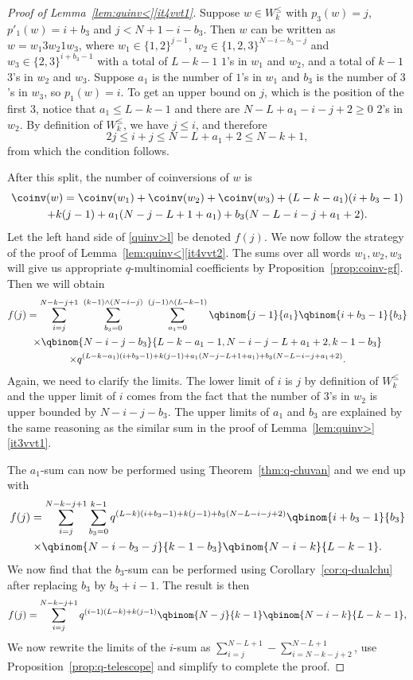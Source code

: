 \begin{proof}[Proof of Lemma~\ref{lem:quinv<}\ref{it4vvt1}]
Suppose $w \in  W_k^\leq$ with $p_3(w) = j$, $p'_1(w) = i+b_3$ and $j < N+1 - i-b_3$. Then
$w$ can be written as $w = w_1 3 w_2 1 w_3$, where $w_1 \in \{1,2\}^{j-1}$, $w_2 \in \{1,2,3\}^{N-i-b_3-j}$ 
and $w_3 \in \{2,3\}^{i+b_3-1}$ with a total of $L-k-1$ $1$'s in $w_1$ and $w_2$, and a total of
$k-1$ $3$'s in $w_2$ and $w_3$. 
Suppose $a_1$ is the number of $1$'s in $w_1$ and $b_3$ is the number of $3$'s in $w_3$, so $p_1(w) = i$. To get an upper bound on $j$, which is the position of the first $3$, notice that $a_1 \leq L-k-1$ and
there are $N-L+a_1-i-j+2\geq 0$ $2$'s in $w_2$. By definition of $W_k^{\leq}$, we have $j \leq i$, and therefore
\[
2j \leq i+j \leq N - L + a_1 + 2 \leq N - k+1,
\]
from which the condition follows.

After this split, the number of coinversions of $w$ is
\begin{multline*}
\coinv(w) = \coinv(w_1) + \coinv(w_2) +\coinv(w_3) + (L-k-a_1)(i+b_3-1)  \\
+ k(j-1) + a_1(N-j-L+1+a_1) + b_3(N-L-i-j+a_1+2).
\end{multline*}
Let the left hand side of \eqref{quinv>l} be denoted $f(j)$.
We now follow the strategy of the proof of Lemma~\ref{lem:quinv<}\ref{it4vvt2}. 
The sums over all
words $w_1, w_2, w_3$ will give us appropriate $q$-multinomial coefficients by 
Proposition~\ref{prop:coinv-gf}. Then we will obtain
\begin{multline*}
f(j) = \sum_{i = j}^{N-k-j+1}\  \sum_{b_3 = 0}^{(k-1) \wedge (N-i-j)}\ \sum_{a_1 = 0}^{(j-1) \wedge (L-k-1)} 
\qbinom {j-1}{a_1} \qbinom{i+b_3-1}{b_3} \\
\times\qbinom {N-i-j-b_3}{L-k-a_1-1, N-i-j-L+a_1+2,k-1-b_3} \\
\times q^{(L-k-a_1)(i+b_3-1) + k(j-1) + a_1(N-j-L+1+a_1) + b_3(N-L-i-j+a_1+2)}.
\end{multline*}
Again, we need to clarify the limits. The lower limit of $i$ is $j$ by definition of $W_k^\leq$
and the upper limit of $i$ comes from the fact that the number of $3$'s in $w_2$ is upper bounded
by $N-i-j-b_3$. The upper limits of $a_1$ and $b_3$ are explained by the same reasoning
as the similar sum in the proof of Lemma~\ref{lem:quinv>}\ref{it3vvt1}.

The $a_1$-sum can now be performed using Theorem~\ref{thm:q-chuvan} and we end up with
\begin{multline*}
f(j) =  \sum_{i = j}^{N-k-j+1}  \sum_{b_3 = 0}^{k-1}  q^{(L-k)(i+b_3-1) + k(j-1) + b_3(N-L-i-j+2)} \qbinom{i+b_3-1}{b_3} \\
\times \qbinom {N-i-b_3-j}{k-1-b_3}  \qbinom {N-i-k}{L-k-1} .
\end{multline*}
We now find that the $b_3$-sum can be performed using Corollary~\ref{cor:q-dualchu} after replacing $b_3$
by $b_3+i-1$.  
The result is then
\[
f(j) = \sum_{i = j}^{N-k-j+1}  q^{(i-1)(L-k) + k(j-1)}  \qbinom {N-j}{k-1}\qbinom {N-i-k}{L-k-1} ,
\]
We now rewrite the limits of the $i$-sum as $\sum_{i = j}^{N-L+1} - \sum_{i = N-k-j+2}^{N-L+1}$,
 use Proposition~\ref{prop:q-telescope} and simplify to complete the proof.
\end{proof}


